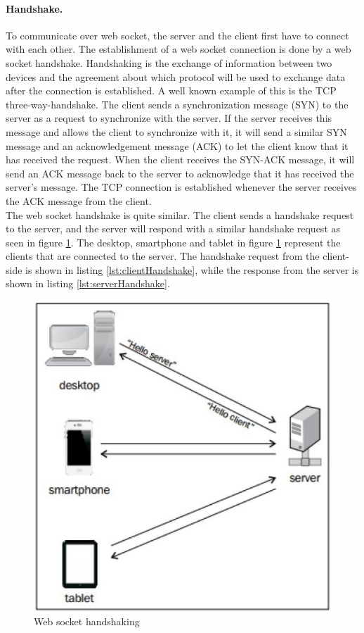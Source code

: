 \documentclass[a4paper, 11pt]{report}
\begin{document}
		\paragraph{Handshake.}
To communicate over web socket, the server and the client first have to connect with each other. The establishment of a web socket connection is done by a web socket handshake. Handshaking is the exchange of information between two devices and the agreement about which protocol will be used to exchange data after the connection is established. A well known example of this is the TCP three-way-handshake. The client sends a synchronization message (SYN) to the server as a request to synchronize with the server. If the server receives this message and allows the client to synchronize with it, it will send a similar SYN message and an acknowledgement message (ACK) to let the client know that it has received the request. When the client receives the SYN-ACK message, it will send an ACK message back to the server to acknowledge that it has received the server's message. The TCP connection is established whenever the server receives the ACK message from the client.\\
The web socket handshake is quite similar. The client sends a handshake request to the server, and the server will respond with a similar handshake request as seen in figure \ref{fig:WebSocketHandshaking}. The desktop, smartphone and tablet in figure \ref{fig:WebSocketHandshaking} represent the clients that are connected to the server. The handshake request from the client-side is shown in listing \ref{lst:clientHandshake}, while the response from the server is shown in listing \ref{lst:serverHandshake}.
	\begin{figure}[ht]
		\centering
		\includegraphics[scale=0.5]{images/server.pdf}
		\caption{Web socket handshaking}\label{fig:WebSocketHandshaking}
	\end{figure}
\end{document}
